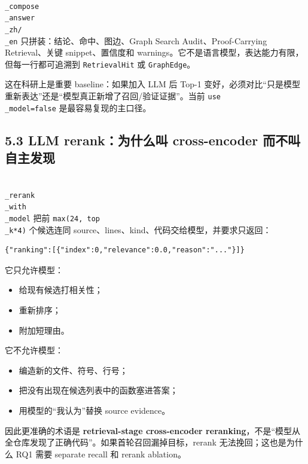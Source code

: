 \documentclass[UTF8,12pt,openany]{ctexbook}
\begin{document}
\texttt{\\_compose\\_answer\\_zh/\\_en} 只拼装：结论、命中、图边、Graph Search Audit、Proof-Carrying Retrieval、关键 snippet、置信度和 warnings。它不是语言模型，表达能力有限，但每一行都可追溯到 \texttt{RetrievalHit} 或 \texttt{GraphEdge}。\par

这在科研上是重要 baseline：如果加入 LLM 后 Top-1 变好，必须对比“只是模型重新表达”还是“模型真正新增了召回/验证证据”。当前 \texttt{use\\_model=false} 是最容易复现的主口径。\par

\subsection{5.3 LLM rerank：为什么叫 cross-encoder 而不叫自主发现}

\texttt{\\_rerank\\_with\\_model} 把前 \texttt{max(24, top\\_k*4)} 个候选连同 source、lines、kind、代码交给模型，并要求只返回：\par

\begin{lstlisting}
{"ranking":[{"index":0,"relevance":0.0,"reason":"..."}]}
\end{lstlisting}

它只允许模型：\par

\begin{itemize}
\item 给现有候选打相关性；
\item 重新排序；
\item 附加短理由。
\end{itemize}

它不允许模型：\par

\begin{itemize}
\item 编造新的文件、符号、行号；
\item 把没有出现在候选列表中的函数塞进答案；
\item 用模型的“我认为”替换 source evidence。
\end{itemize}

因此更准确的术语是 \textbf{retrieval-stage cross-encoder reranking}，不是“模型从全仓库发现了正确代码”。如果首轮召回漏掉目标，rerank 无法挽回；这也是为什么 RQ1 需要 separate recall 和 rerank ablation。\par
\end{document}
